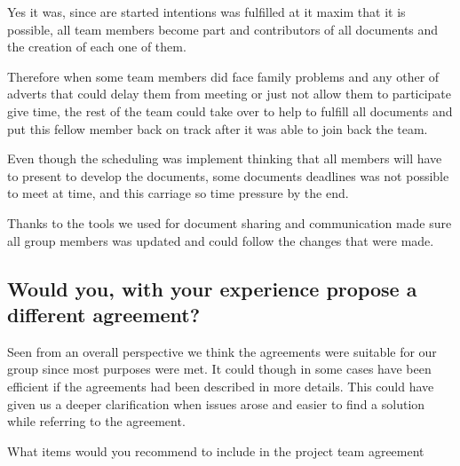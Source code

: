 Yes it was, since are started intentions was fulfilled at it maxim that it is possible, all team members become part and contributors of all documents and the creation of each one of them. 

Therefore when some team members did face family problems and any other of adverts that could delay them from meeting or just not allow them to participate give time, the rest of the team could take over to help to fulfill all documents and put this fellow member back on track after it was able to join back the team.

Even though the scheduling was implement thinking that all members will have to present to develop the documents, some documents deadlines was not possible to meet at time, and this carriage so time pressure by the end. 

Thanks to the tools we used for document sharing and communication made sure all group members was updated and could follow the changes that were made.

\subsection*{Would you, with your experience propose a different agreement?}

Seen from an overall perspective we think the agreements were suitable for our group since most purposes were met. It could though in some cases have been efficient if the agreements had been described in more details. This could have given us a deeper clarification when issues arose and easier to find a solution while referring to the agreement. 

What items would you recommend to include in the project team agreement

